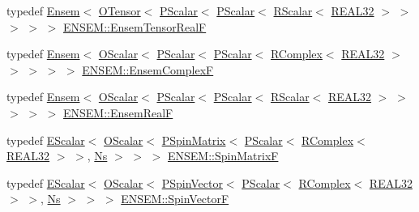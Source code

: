 \begin{DoxyCompactItemize}
\item 
typedef \mbox{\hyperlink{classENSEM_1_1Ensem}{Ensem}}$<$ \mbox{\hyperlink{classENSEM_1_1OTensor}{O\+Tensor}}$<$ \mbox{\hyperlink{classENSEM_1_1PScalar}{P\+Scalar}}$<$ \mbox{\hyperlink{classENSEM_1_1PScalar}{P\+Scalar}}$<$ \mbox{\hyperlink{classENSEM_1_1RScalar}{R\+Scalar}}$<$ \mbox{\hyperlink{namespaceENSEM_a7540d01191172323e9073283d772576d}{R\+E\+A\+L32}} $>$ $>$ $>$ $>$ $>$ \mbox{\hyperlink{group__defs_ga0da81ce50f4b2ae81c1190e8e266480c}{E\+N\+S\+E\+M\+::\+Ensem\+Tensor\+RealF}}
\item 
typedef \mbox{\hyperlink{classENSEM_1_1Ensem}{Ensem}}$<$ \mbox{\hyperlink{classENSEM_1_1OScalar}{O\+Scalar}}$<$ \mbox{\hyperlink{classENSEM_1_1PScalar}{P\+Scalar}}$<$ \mbox{\hyperlink{classENSEM_1_1PScalar}{P\+Scalar}}$<$ \mbox{\hyperlink{classENSEM_1_1RComplex}{R\+Complex}}$<$ \mbox{\hyperlink{namespaceENSEM_a7540d01191172323e9073283d772576d}{R\+E\+A\+L32}} $>$ $>$ $>$ $>$ $>$ \mbox{\hyperlink{group__defs_gaac62e751aea40f9e3423a058ca20c7c9}{E\+N\+S\+E\+M\+::\+Ensem\+ComplexF}}
\item 
typedef \mbox{\hyperlink{classENSEM_1_1Ensem}{Ensem}}$<$ \mbox{\hyperlink{classENSEM_1_1OScalar}{O\+Scalar}}$<$ \mbox{\hyperlink{classENSEM_1_1PScalar}{P\+Scalar}}$<$ \mbox{\hyperlink{classENSEM_1_1PScalar}{P\+Scalar}}$<$ \mbox{\hyperlink{classENSEM_1_1RScalar}{R\+Scalar}}$<$ \mbox{\hyperlink{namespaceENSEM_a7540d01191172323e9073283d772576d}{R\+E\+A\+L32}} $>$ $>$ $>$ $>$ $>$ \mbox{\hyperlink{group__defs_gab272a08b4cb02e4fae683911645bd3e1}{E\+N\+S\+E\+M\+::\+Ensem\+RealF}}
\item 
typedef \mbox{\hyperlink{classENSEM_1_1EScalar}{E\+Scalar}}$<$ \mbox{\hyperlink{classENSEM_1_1OScalar}{O\+Scalar}}$<$ \mbox{\hyperlink{classENSEM_1_1PSpinMatrix}{P\+Spin\+Matrix}}$<$ \mbox{\hyperlink{classENSEM_1_1PScalar}{P\+Scalar}}$<$ \mbox{\hyperlink{classENSEM_1_1RComplex}{R\+Complex}}$<$ \mbox{\hyperlink{namespaceENSEM_a7540d01191172323e9073283d772576d}{R\+E\+A\+L32}} $>$ $>$, \mbox{\hyperlink{namespaceENSEM_a6f05e048f9b2eb1a19131074f8abc25f}{Ns}} $>$ $>$ $>$ \mbox{\hyperlink{group__defs_ga9332913187b2b1a824c75f7c9cafd4d3}{E\+N\+S\+E\+M\+::\+Spin\+MatrixF}}
\item 
typedef \mbox{\hyperlink{classENSEM_1_1EScalar}{E\+Scalar}}$<$ \mbox{\hyperlink{classENSEM_1_1OScalar}{O\+Scalar}}$<$ \mbox{\hyperlink{classENSEM_1_1PSpinVector}{P\+Spin\+Vector}}$<$ \mbox{\hyperlink{classENSEM_1_1PScalar}{P\+Scalar}}$<$ \mbox{\hyperlink{classENSEM_1_1RComplex}{R\+Complex}}$<$ \mbox{\hyperlink{namespaceENSEM_a7540d01191172323e9073283d772576d}{R\+E\+A\+L32}} $>$ $>$, \mbox{\hyperlink{namespaceENSEM_a6f05e048f9b2eb1a19131074f8abc25f}{Ns}} $>$ $>$ $>$ \mbox{\hyperlink{group__defs_gac8b2551d6b9e8c0baa2f4261f966b28a}{E\+N\+S\+E\+M\+::\+Spin\+VectorF}}

\end{DoxyCompactItemize}
